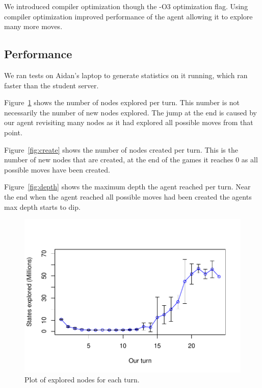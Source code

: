 \documentclass[12pt]{article}
\begin{document}
We introduced compiler optimization though the -O3 optimization flag.
Using compiler optimization improved performance of the agent allowing it to explore many more moves.

\subsection*{Performance}
We ran tests on Aidan's laptop to generate statistics on it running, which ran faster than the student server.

Figure~\ref{fig:explore} shows the number of nodes explored per turn.
This number is not necessarily the number of new nodes explored.
The jump at the end is caused by our agent revisiting many nodes as it had explored all possible moves from that point.

Figure~\ref{fig:create} shows the number of nodes created per turn.
This is the number of new nodes that are created, at the end of the games it reaches 0 as all possible moves have been created.

Figure~\ref{fig:depth} shows the maximum depth the agent reached per turn.
Near the end when the agent reached all possible moves had been created the agents max depth starts to dip.

\begin{figure}
  \centering
  \includegraphics[scale=0.5]{../results/explored_plot.pdf}
  \caption{Plot of explored nodes for each turn.}
  \label{fig:explore}
\end{figure}
\end{document}
